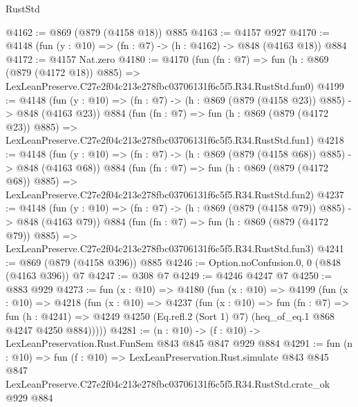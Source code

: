 \begin{lexlean}{RustStd}
\begin{coremodule}
@4162 := @869 (@879 (@4158 @18)) @885
@4163 := @4157 @927
@4170 := @4148 (fun (y : @10) => (fn : @7) -> (h : @4162) -> @848 (@4163 @18)) @884
@4172 := @4157 Nat.zero
@4180 := @4170
    (fun (fn : @7) =>
    fun (h : @869 (@879 (@4172 @18)) @885) =>
    LexLeanPreserve.C27e2f04c213e278fbc03706131f6c5f5.R34.RustStd.fun0)
@4199 := @4148
    (fun (y : @10) => (fn : @7) -> (h : @869 (@879 (@4158 @23)) @885) -> @848 (@4163 @23))
    @884
    (fun (fn : @7) =>
    fun (h : @869 (@879 (@4172 @23)) @885) =>
    LexLeanPreserve.C27e2f04c213e278fbc03706131f6c5f5.R34.RustStd.fun1)
@4218 := @4148
    (fun (y : @10) => (fn : @7) -> (h : @869 (@879 (@4158 @68)) @885) -> @848 (@4163 @68))
    @884
    (fun (fn : @7) =>
    fun (h : @869 (@879 (@4172 @68)) @885) =>
    LexLeanPreserve.C27e2f04c213e278fbc03706131f6c5f5.R34.RustStd.fun2)
@4237 := @4148
    (fun (y : @10) => (fn : @7) -> (h : @869 (@879 (@4158 @79)) @885) -> @848 (@4163 @79))
    @884
    (fun (fn : @7) =>
    fun (h : @869 (@879 (@4172 @79)) @885) =>
    LexLeanPreserve.C27e2f04c213e278fbc03706131f6c5f5.R34.RustStd.fun3)
@4241 := @869 (@879 (@4158 @396)) @885
@4246 := Option.noConfusion.{0, 0} (@848 (@4163 @396)) @7
@4247 := @308 @7
@4249 := @4246 @4247 @7
@4250 := @883 @929
@4273 := fun (x : @10) =>
  @4180
    (fun (x : @10) =>
    @4199
      (fun (x : @10) =>
      @4218
        (fun (x : @10) =>
        @4237
          (fun (x : @10) =>
          fun (fn : @7) =>
          fun (h : @4241) =>
          @4249 @4250 (Eq.refl.{2} (Sort 1) @7) (heq_of_eq.{1} @868 @4247 @4250 @884)))))
@4281 := (n : @10) -> (f : @10) -> LexLeanPreservation.Rust.FunSem @843 @845 @847 @929 @884
@4291 := fun (n : @10) =>
  fun (f : @10) =>
  LexLeanPreservation.Rust.simulate
    @843
    @845
    @847
    LexLeanPreserve.C27e2f04c213e278fbc03706131f6c5f5.R34.RustStd.crate_ok
    @929
    @884
\end{coremodule}
\end{lexlean}
